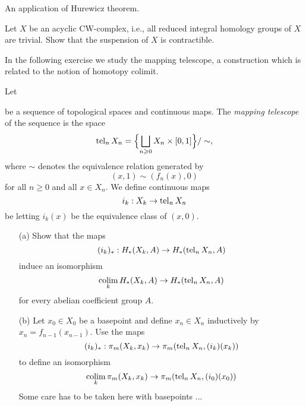 An application of Hurewicz theorem.

\label{exercise:AT1Sheet2.2}
Let $X$ be an acyclic CW-complex, i.e., all reduced integral homology groups of $X$ are trivial. Show that the suspension of $X$ is contractible.

\begin{sketch}
\end{sketch}

In the following exercise we study the mapping telescope, a construction which is related to the notion of homotopy colimit.

\label{exercise:AT1Sheet2.3}
Let 
\begin{center}
\end{center}
be a sequence of topological spaces and continuous maps. The \textit{mapping telescope} of the sequence is the space
\begin{equation*}
    \operatorname{tel}_{n} X_{n} = \Bigl\{ \bigsqcup_{n \geqslant 0} X_{n} \times [0, 1] \Bigr\} / \sim,
\end{equation*}
where $\sim$ denotes the equivalence relation generated by
\begin{equation*}
    (x, 1) \sim (f_{n}(x), 0)
\end{equation*}
for all $n \geq 0$ and all $x \in X_{n}$. We define continuous maps
\begin{equation*}
    i_{k} : X_{k} \rightarrow \operatorname{tel}_{n} X_{n}
\end{equation*}
be letting $i_{k}(x)$ be the equivalence class of $(x, 0)$.
\begin{enumerate}
    \item[(a)] Show that the maps
    \begin{equation*}
        (i_{k})_{*} : H_{*}(X_{k}, A) \rightarrow H_{*}(\operatorname{tel}_{n}X_{n}, A)
    \end{equation*}
    induce an isomorphism
    \begin{equation*}
        \operatorname*{colim}_{k}H_{*}(X_{k}, A) \rightarrow H_{*}(\operatorname{tel}_{n} X_{n}, A)
    \end{equation*}
    for every abelian coefficient group $A$.
    \item[(b)] Let $x_{0} \in X_{0}$ be a basepoint and define $x_{n} \in X_{n}$ inductively by $x_{n} = f_{n - 1}(x_{n-1})$. Use the maps
    \begin{equation*}
        (i_{k})_{*} : \pi_{m}(X_{k}, x_{k}) \rightarrow \pi_{m}(\operatorname{tel}_{n}X_{n}, (i_{k})(x_{k}))
    \end{equation*}
    to define an isomorphism
    \begin{equation*}
        \operatorname*{colim}_{k} \pi_{m}(X_{k}, x_{k}) \rightarrow \pi_{m}(\operatorname{tel}_{n}X_{n}, (i_{0})(x_{0}))
    \end{equation*}
    Some care has to be taken here with basepoints ...
\end{enumerate}

